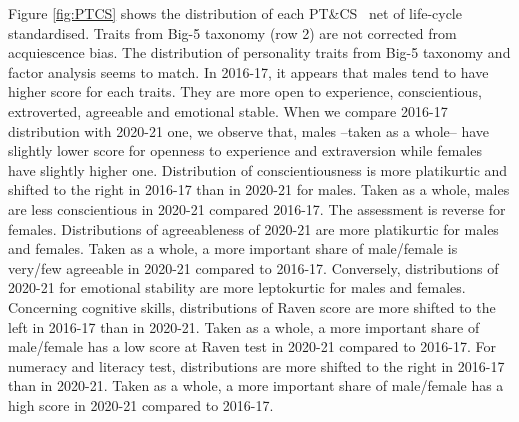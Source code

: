 \documentclass[a4paper, 12pt, onecolumn]{article}
\newcommand{\PTCS}{PT\&CS}
\begin{document}
Figure \ref{fig:PTCS} shows the distribution of each \PTCS~ net of life-cycle standardised.
Traits from Big-5 taxonomy (row 2) are not corrected from acquiescence bias.
The distribution of personality traits from Big-5 taxonomy and factor analysis seems to match.
In 2016-17, it appears that males tend to have higher score for each traits.
They are more open to experience, conscientious, extroverted, agreeable and emotional stable.
When we compare 2016-17 distribution with 2020-21 one, we observe that, males --taken as a whole-- have slightly lower score for openness to experience and extraversion while females have slightly higher one.
Distribution of conscientiousness is more platikurtic and shifted to the right in 2016-17 than in 2020-21 for males.
Taken as a whole, males are less conscientious in 2020-21 compared 2016-17.
The assessment is reverse for females.
Distributions of agreeableness of 2020-21 are more platikurtic for males and females.
Taken as a whole, a more important share of male/female is very/few agreeable in 2020-21 compared to 2016-17.
Conversely, distributions of 2020-21 for emotional stability are more leptokurtic for males and females.
Concerning cognitive skills, distributions of Raven score are more shifted to the left in 2016-17 than in 2020-21.
Taken as a whole, a more important share of male/female has a low score at Raven test in 2020-21 compared to 2016-17.
For numeracy and literacy test, distributions are more shifted to the right in 2016-17 than in 2020-21.
Taken as a whole, a more important share of male/female has a high score in 2020-21 compared to 2016-17.
\end{document}
